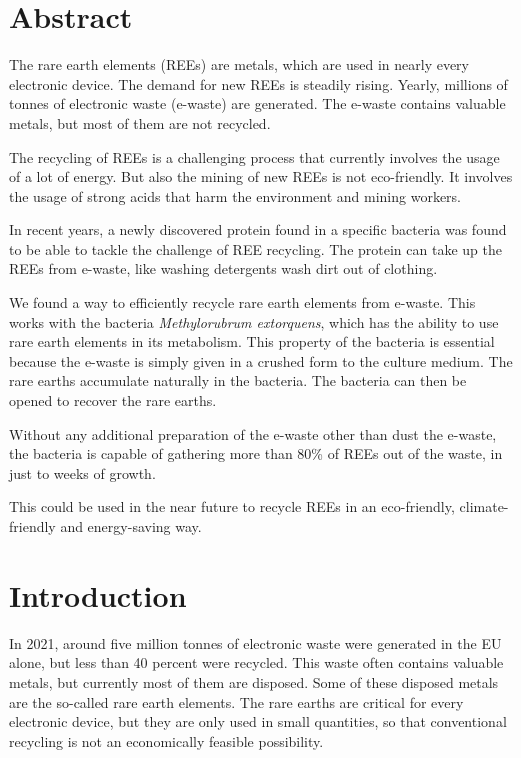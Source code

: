 \chapter*{Abstract}

The rare earth elements (REEs) are metals, which are used in nearly every electronic device.
The demand for new REEs is steadily rising.
Yearly, millions of tonnes of electronic waste (e-waste) are generated.
The e-waste contains valuable metals, but most of them are not recycled.

The recycling of REEs is a challenging process that currently involves the usage of a lot of energy.
But also the mining of new REEs is not eco-friendly.
It involves the usage of strong acids that harm the environment and mining workers.

In recent years, a newly discovered protein found in a specific bacteria was found to be able to tackle the challenge of REE recycling.
The protein can take up the REEs from e-waste, like washing detergents wash dirt out of clothing.

We found a way to efficiently recycle rare earth elements from e-waste.
This works with the bacteria \emph{Methylorubrum extorquens}, which has the ability to use rare earth elements in its metabolism.
This property of the bacteria is essential because the e-waste is simply given in a crushed form to the culture medium.
The rare earths accumulate naturally in the bacteria.
The bacteria can then be opened to recover the rare earths.

Without any additional preparation of the e-waste other than dust the e-waste, the bacteria is capable of gathering more than 80\% of REEs out of the waste, in just to weeks of growth.

This could be used in the near future to recycle REEs in an eco-friendly, climate-friendly and energy-saving way.

\chapter*{Introduction}

In 2021, around five million tonnes of electronic waste were generated in the EU alone, but less than 40 percent were recycled.
This waste often contains valuable metals, but currently most of them are disposed.
Some of these disposed metals are the so-called rare earth elements.
The rare earths are critical for every electronic device, but they are only used in small quantities, so that conventional recycling is not an economically feasible possibility.

